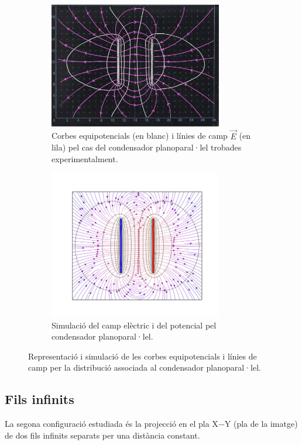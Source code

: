 \documentclass[a4paper,10.5pt]{report}
\begin{document}
\begin{figure}
	\centering
	\begin{subfigure}{0.45\linewidth}
		\centering
		\includegraphics[height=5.5cm]{dibplaques} %
		\caption{Corbes equipotencials (en blanc) i línies de camp $\vec{E}$ (en lila) pel cas del condensador planoparal·lel trobades experimentalment.}
		\label{fig:1.2a}
	\end{subfigure}
	\hfill
	\begin{subfigure}{0.53\linewidth}
		\centering
		\includegraphics[height=6.5cm]{figplaques1} %
		\caption{Simulació del camp elèctric i del potencial pel condensador planoparal·lel.}
		\label{fig:1.2b}
	\end{subfigure}
	\caption{Representació i simulació de les corbes equipotencials i línies de camp per la distribució associada al condensador planoparal·lel.}
	\label{fig:1.2}
\end{figure}


\subsection{Fils infinits}
La segona configuració estudiada és la projecció en el pla X$-$Y (pla de la imatge) de dos fils infinits separats per una distància constant. 
\end{document}
